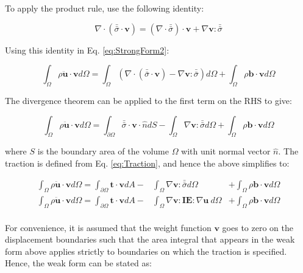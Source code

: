 \documentclass[10pt]{article}
\begin{document}
To apply the product rule, use the following identity:

\begin{equation}
\nabla\cdot(\bar{\bar{\sigma}}\cdot\textbf{v})=(\nabla\cdot\bar{\bar{\sigma}})\cdot\textbf{v}+\nabla\textbf{v}:\bar{\bar{\sigma}}
\end{equation}

Using this identity in Eq. \eqref{eq:StrongForm2}:

\begin{equation}
\int_{\Omega}\rho\ddot{\textbf{u}}\cdot \textbf{v}d\Omega=\int_{\Omega}\left(\nabla\cdot(\bar{\bar{\sigma}}\cdot\textbf{v})-\nabla\textbf{v}:\bar{\bar{\sigma}}\right)d\Omega+\int_{\Omega}\rho\textbf{b}\cdot\textbf{v}d\Omega
\end{equation}

The divergence theorem can be applied to the first term on the RHS to give:

\begin{equation}
\int_{\Omega}\rho\ddot{\textbf{u}}\cdot \textbf{v}d\Omega=\int_{\partial\Omega}\bar{\bar{\sigma}}\cdot\textbf{v}\cdot\hat{n}dS-\int_{\Omega}\nabla\textbf{v}:\bar{\bar{\sigma}}d\Omega+\int_{\Omega}\rho\textbf{b}\cdot\textbf{v}d\Omega
\end{equation}

where \(S\) is the boundary area of the volume \(\Omega\) with unit normal vector \(\hat{n}\). The traction is defined from Eq. \eqref{eq:Traction}, and hence the above simplifies to:

\begin{equation}
\begin{aligned}
\int_{\Omega}\rho\ddot{\textbf{u}}\cdot \textbf{v}d\Omega=\int_{\partial\Omega}\textbf{t}\cdot\textbf{v}dA-& \int_{\Omega}\nabla\textbf{v}:\bar{\bar{\sigma}}d\Omega& +\int_{\Omega}\rho\textbf{b}\cdot\textbf{v}d\Omega\\
\int_{\Omega}\rho\ddot{\textbf{u}}\cdot \textbf{v}d\Omega=\int_{\partial\Omega}\textbf{t}\cdot\textbf{v}dA-& \int_{\Omega}\nabla\textbf{v}:\textbf{IE}:\nabla\textbf{u}\ d\Omega& +\int_{\Omega}\rho\textbf{b}\cdot\textbf{v}d\Omega\\
\end{aligned}
\end{equation}

For convenience, it is assumed that the weight function \(\textbf{v}\) goes to zero on the displacement boundaries such that the area integral that appears in the weak form above applies strictly to boundaries on which the traction is specified. Hence, the weak form can be stated as:
\end{document}

